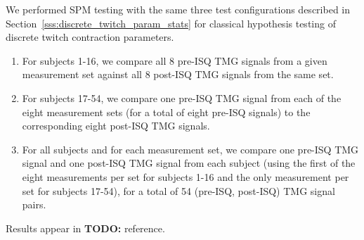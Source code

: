 \documentclass[utf8]{style/FrontiersinHarvard}
\newcommand{\TODO}[1]{{\textbf{TODO:} {\color{red} #1}}}
\newcommand{\SPMStart}{\ensuremath{\text{SPMStartTime}}\xspace}
\newcommand{\SPMEnd}{\ensuremath{\text{SPMEndTime}}\xspace}
\newcommand{\SPMCentroidTime}{\ensuremath{\text{SPMCentroidTime}}\xspace}
\newcommand{\SPMCentroidT}{\ensuremath{\text{SPMCentroid}}\xspace}
\newcommand{\SPMMax}{\ensuremath{\text{SPMMax}}\xspace}
\newcommand{\SPMArea}{\ensuremath{\text{SPMArea}}\xspace}
\begin{document}
We performed SPM testing with the same three test configurations described in Section~\ref{sss:discrete_twitch_param_stats} for classical hypothesis testing of discrete twitch contraction parameters.
\begin{enumerate}

    \item For subjects 1-16, we compare all 8 pre-ISQ TMG signals from a given measurement set against all 8 post-ISQ TMG signals from the same set.

    \item For subjects 17-54, we compare one pre-ISQ TMG signal from each of the eight measurement sets (for a total of eight pre-ISQ signals) to the corresponding eight post-ISQ TMG signals.

    \item For all subjects and for each measurement set, we compare one pre-ISQ TMG signal and one post-ISQ TMG signal from each subject (using the first of the eight measurements per set for subjects 1-16 and the only measurement per set for subjects 17-54), for a total of 54 (pre-ISQ, post-ISQ) TMG signal pairs.

\end{enumerate}
Results appear in \TODO{reference}.


\end{document}
